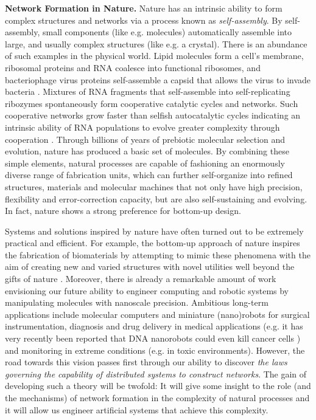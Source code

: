 \documentclass[oribibl, 11pt]{llncs}
\begin{document}
\noindent\textbf{Network Formation in Nature.} Nature has an intrinsic ability to form complex structures and networks via a process known as \emph{self-assembly}. By self-assembly, small components (like e.g. molecules) automatically assemble into large, and usually complex structures (like e.g. a crystal). There is an abundance of such examples in the physical world. Lipid molecules form a cell's membrane, ribosomal proteins and RNA coalesce into functional ribosomes, and bacteriophage virus proteins self-assemble a capsid that allows the virus to invade bacteria \cite{Do12}. Mixtures of RNA fragments that self-assemble into self-replicating ribozymes spontaneously form cooperative catalytic cycles and networks. Such cooperative networks grow faster than selfish autocatalytic cycles indicating an intrinsic ability of RNA populations to evolve greater complexity through cooperation \cite{VMC12}. Through billions of years of prebiotic molecular selection and evolution, nature has produced a basic set of molecules. By combining these simple elements, natural processes are capable of fashioning an enormously diverse range of fabrication units, which can further self-organize into refined structures, materials and molecular machines that not only have high precision, flexibility and error-correction capacity, but are also self-sustaining and evolving. In fact, nature shows a strong preference for bottom-up design.

Systems and solutions inspired by nature have often turned out to be extremely practical and efficient. For example, the bottom-up approach of nature inspires the fabrication of biomaterials by attempting to mimic these phenomena with the aim of creating new and varied structures with novel utilities well beyond the gifts of nature \cite{Zh03}. Moreover, there is already a remarkable amount of work envisioning our future ability to engineer computing and robotic systems by manipulating molecules with nanoscale precision. Ambitious long-term applications include molecular computers \cite{BPSPF10} and miniature (nano)robots for surgical instrumentation, diagnosis and drug delivery in medical applications (e.g. it has very recently been reported that DNA nanorobots could even kill cancer cells \cite{DBC12}) and monitoring in extreme conditions (e.g. in toxic environments). However, the road towards this vision passes first through our ability to discover \emph{the laws governing the capability of distributed systems to construct networks}. The gain of developing such a theory will be twofold: It will give some insight to the role (and the mechanisms) of network formation in the complexity of natural processes and it will allow us engineer artificial systems that achieve this complexity.
\end{document}
